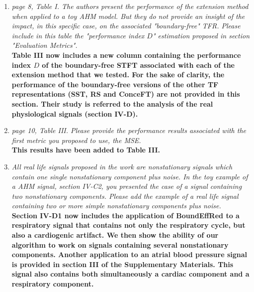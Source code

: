 \documentclass[11pt,DIV=16]{scrartcl}
\begin{document}
\begin{enumerate}[1)]
{dozen oscillations is generally appropriate.}
\item
\textit{page 8, Table I. The authors present the performance of the extension method when applied to a toy AHM model. But they do not provide an insight of the impact, in this specific case, on the associated "boundary-free" TFR. Please include in this table the "performance index $D$" estimation proposed in section "Evaluation Metrics".}\\
\textbf{Table III now includes a new column containing the performance index $D$ of the boundary-free STFT associated with each of the extension method that we tested. For the sake of clarity, the performance of the boundary-free versions of the other TF representations (SST, RS and ConceFT) are not provided in this section. Their study is referred to the analysis of the real physiological signals (section IV-D).}
\item
\textit{page 10, Table III. Please provide the performance results associated with the first metric you proposed to use, the MSE. }\\
\textbf{This results have been added to Table III.}
\item
\textit{All real life signals proposed in the work are nonstationary signals which contain one single nonstationary component plus noise. In the toy example of a  AHM signal, section IV-C2, you presented the case of a signal containing two nonstationary components. Please add the example of a real life signal containing two or more simple nonstationary components plus noise.}\\
\textbf{Section IV-D1 now includes the application of \textsf{BoundEffRed} to a respiratory signal that contains not only the respiratory cycle, but also a
cardiogenic artifact. We then show the ability of our algorithm to work on
signals containing several nonstationary components. Another application to an atrial blood pressure signal is provided in section III of the Supplementary Materials. This signal also contains both simultaneously a cardiac component and a respiratory component.}
\end{enumerate}
\end{document}
